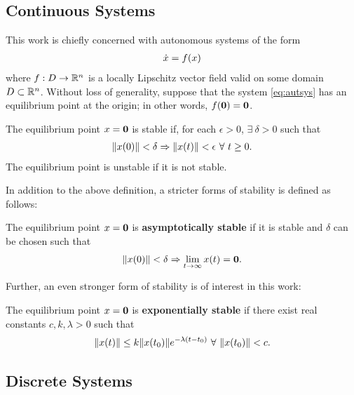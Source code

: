 \subsection{Continuous Systems}

This work is chiefly concerned with autonomous systems of the form
\begin{align}
  \label{eq:autsys}
  {\dot {x}} = f(x)
\end{align}
where $f : D \to \mathbb{R}^{n}$ is a locally Lipschitz vector field valid on some
domain $D \subset \mathbb{R}^{n}$.
%
Without loss of generality, suppose that the system \eqref{eq:autsys} has an
equilibrium point at the origin;
%
in other words, $f({\mathbf 0}) = {\mathbf 0}$.
%
\begin{definition}
  The equilibrium point $x = {\mathbf 0}$ is stable if, for each $\epsilon > 0$,
  $\exists \ \delta > 0$ such that
  \begin{align*}
    \|x(0)\| < \delta \Rightarrow \|x(t)\| < \epsilon \ \forall \ t
    \geq 0.
  \end{align*}
  The equilibrium point is unstable if it is not stable.
\end{definition}

In addition to the above definition, a stricter forms of stability is defined as
follows:
%
\begin{definition}
  The equilibrium point $x = {\mathbf 0}$ is {\bf asymptotically stable} if it is
  stable and $\delta$ can be chosen such that
  \begin{align*}
    \|x(0)\| < \delta \Rightarrow \lim_{t \to \infty} x(t) = {\mathbf 0}.
  \end{align*}
\end{definition}

Further, an even stronger form of stability is of interest in this work:
%
\begin{definition}
  The equilibrium point $x = {\mathbf 0}$ is {\bf exponentially stable} if there
  exist real constants $c, k, \lambda > 0$ such that
  \begin{align*}
    \nxt \leq k \nxtnaught e^{-\lambda (t - t_{0})} \ \forall \ \nxtnaught < c.
  \end{align*}
\end{definition}


\subsection{Discrete Systems}

